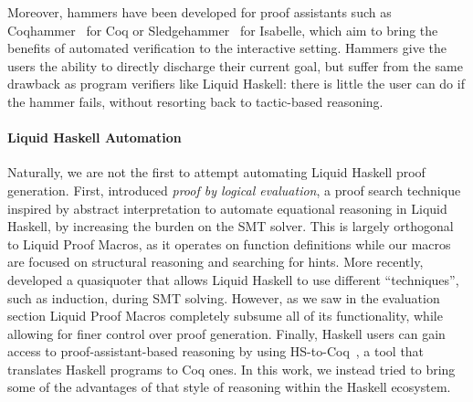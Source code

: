 Moreover, hammers have been developed for proof assistants
such as Coqhammer~\cite{CoqHammer, Coqhammer-sauto} for Coq or
Sledgehammer~\cite{Sledgehammer, SledgehammerSMT} for Isabelle, which
aim to bring the benefits of automated verification to the interactive
setting. Hammers give the users the ability to directly discharge
their current goal, but suffer from the same drawback as program
verifiers like Liquid Haskell: there is little the user can do if the
hammer fails, without resorting back to tactic-based reasoning.  
%  

\paragraph{Liquid Haskell Automation}
Naturally, we are not the first to attempt automating Liquid Haskell
proof generation.  First, \citet{VazouTCSNWJ18} introduced {\em proof
  by logical evaluation}, a proof search technique inspired by
abstract interpretation to automate equational reasoning in Liquid
Haskell, by increasing the burden on the SMT solver. This is largely
orthogonal to Liquid Proof Macros, as it operates on function
definitions while our macros are focused on structural reasoning and
searching for hints. More recently, \citet{TacticThesis} developed a
quasiquoter that allows Liquid Haskell to use different ``techniques'',
such as induction, during SMT solving. However, as we saw in the evaluation
section Liquid Proof Macros completely subsume all of its functionality,
while allowing for finer control over proof generation.
%
Finally, Haskell users can gain access to proof-assistant-based
reasoning by using HS-to-Coq~\cite{BreitnerSLRWCW21}, a tool that
translates Haskell programs to Coq ones. In this work, we instead
tried to bring some of the advantages of that style of reasoning
within the Haskell ecosystem.


%  


